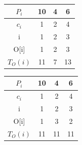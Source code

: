\begin{figure}
    \begin{center}
        \begin{minipage}[c]{\figurewidth}
            \begin{center}
                
                \begin{subfigure}{.5\textwidth}
                    \centering
                    \begin{tabular}[c]{|c|c|c|c|}
                        \hline
                        $P_i$ & 10 & 4 & 6 \\
                        \hline
                        $c_i$ &  1 & 2 & 4  \\
                        \hline
                        \rowcolor[gray]{.9}
                        i & 1 & 2 & 3  \\
                        \hline
                        \rowcolor[gray]{.9}
                        O[i] & 1 & 2 & 3  \\
                        \hline
                    		\rowcolor[gray]{.9}
                        $T_{O}(i)$ & 11 & 7 & 13  \\
                        \hline
                    \end{tabular}
                    \caption{ }
                    \label{fig:ej1nooptimo}
                \vspace{2ex}
                \end{subfigure}
                
                \begin{subfigure}{.3\textwidth}
                    \centering
                    \begin{tabular}[c]{|c|c|c|c|}
                        \hline
                        $P_i$ & 10 & 4 & 6 \\
                        \hline
                        $c_i$ &  1 & 2 & 4  \\
                        \hline
                        \rowcolor[gray]{.9}
                        i & 1 & 2 & 3  \\
                        \hline
                        \rowcolor[gray]{.9}
                        O[i] & 1 & 3 & 2  \\
                        \hline
                    		\rowcolor[gray]{.9}
                        $T_{O}(i)$ & 11 & 11 & 11  \\
                        \hline
                    \end{tabular}
                    \caption{ }
                    \label{fig:ej1optimo}
                \vspace{2ex}
                \end{subfigure}
                

\end{center}
\end{minipage}
\end{center}
\end{figure}
